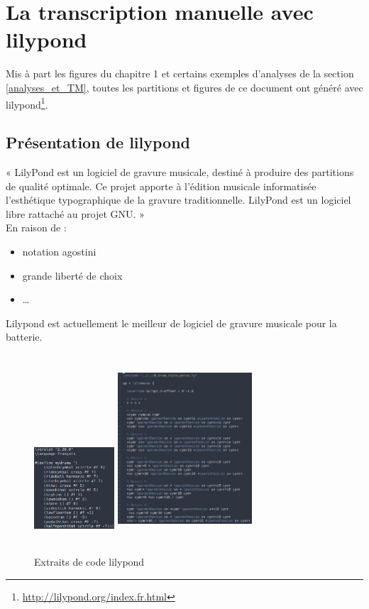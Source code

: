 \section{La transcription manuelle avec lilypond}
\label{tm}
Mis à part les figures du chapitre 1 et certains exemples d’analyses de la
section \ref{analyses_et_TM}, toutes les partitions et figures de ce document
ont généré avec lilypond\footnote{\url{http://lilypond.org/index.fr.html}}.\\

\subsection*{Présentation de lilypond}
« LilyPond est un logiciel de gravure musicale, destiné à produire des
partitions de qualité optimale. Ce projet apporte à l’édition musicale
informatisée l’esthétique typographique de la gravure traditionnelle. LilyPond
est un logiciel libre rattaché au projet GNU. »\\

En raison de :
\begin{itemize}
    \item notation agostini
    \item grande liberté de choix
    \item …
\end{itemize}

Lilypond est actuellement le meilleur de logiciel de gravure musicale pour la
batterie.

\begin{figure}[h]
    \centering
    \includegraphics[height=40mm, width=30mm]{
    z_images/3_methodes/transcription_manuelle/drum_perso_1}
    \includegraphics[height=70mm, width=50mm]{
    z_images/3_methodes/transcription_manuelle/extrait_code.png}
    \caption{Extraits de code lilypond}
    \label{extrait_code}
\end{figure}

